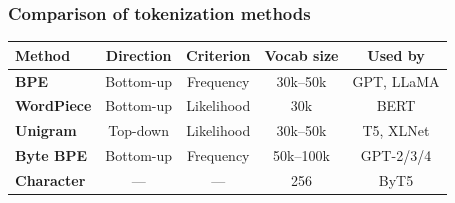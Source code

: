 \documentclass[aspectratio=169]{beamer}
\begin{document}
\begin{frame}
\frametitle{Comparison of tokenization methods}

\vspace{-0.3cm}
\renewcommand{\arraystretch}{1.5}
\begin{center}
{\small
\begin{tabular}{>{\bfseries}l c c c c}
  \textbf{Method} & \textbf{Direction} & \textbf{Criterion} & \textbf{Vocab size} & \textbf{Used by} \\
  \hline
  \textcolor{popblue}{BPE} & Bottom-up & Frequency & 30k--50k & GPT, LLaMA \\[2pt]
  \textcolor{paramgreen}{WordPiece} & Bottom-up & Likelihood & 30k & BERT \\[2pt]
  \textcolor{violet1}{Unigram} & Top-down & Likelihood & 30k--50k & T5, XLNet \\[2pt]
  \textcolor{orange1}{Byte BPE} & Bottom-up & Frequency & 50k--100k & GPT-2/3/4 \\[2pt]
  \textcolor{sampred}{Character} & --- & --- & 256 & ByT5 \\
  \hline
\end{tabular}
}
\end{center}

\vspace{0.4cm}
\begin{center}
\end{center}
\end{frame}
\end{document}

